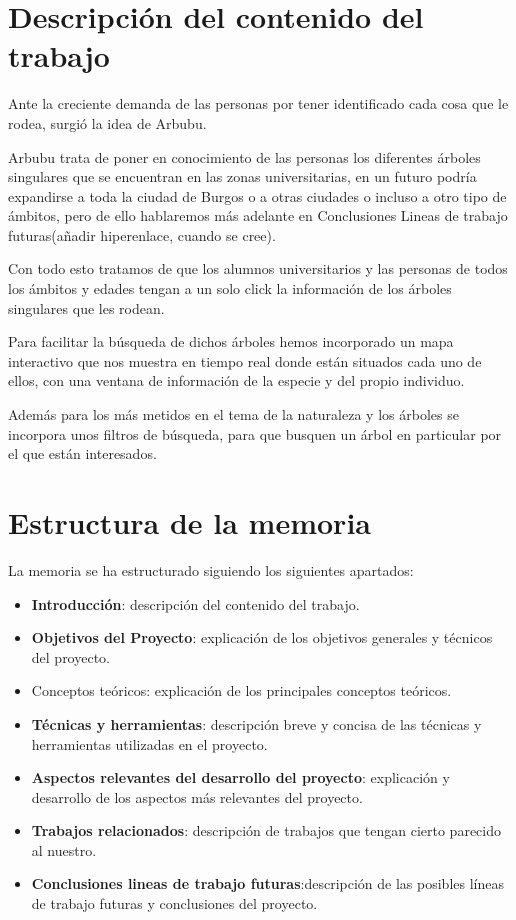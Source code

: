 
\section{Descripción del contenido del trabajo}
Ante la creciente demanda de las personas por tener identificado cada cosa que le rodea, surgió la idea de Arbubu.

Arbubu trata de poner en conocimiento de las personas los diferentes árboles singulares que se encuentran en las zonas universitarias, en un futuro podría expandirse a toda la ciudad de Burgos o a otras ciudades o incluso a otro tipo de ámbitos, pero de ello hablaremos más adelante en Conclusiones Lineas de trabajo futuras(añadir hiperenlace, cuando se cree).

Con todo esto tratamos de que los alumnos universitarios y las personas de todos los ámbitos y edades tengan a un solo click la información de los árboles singulares que les rodean.

Para facilitar la búsqueda de dichos árboles hemos incorporado un mapa interactivo que nos muestra en tiempo real donde están situados cada uno de ellos, con una ventana de información de la especie y del propio individuo.

Además para los más metidos en el tema de la naturaleza y los árboles se incorpora unos filtros de búsqueda, para que busquen un árbol en particular por el que están interesados.


\section{Estructura de la memoria}
La memoria se ha estructurado siguiendo los siguientes apartados:
\begin{itemize}
	\item \textbf{Introducción}: descripción del contenido del trabajo.
	\item \textbf{Objetivos del Proyecto}: explicación de los objetivos generales y técnicos del proyecto.
	\item Conceptos teóricos: explicación de los principales conceptos teóricos.
	\item \textbf{Técnicas y herramientas}: descripción breve y concisa de las técnicas y herramientas utilizadas en el proyecto.
	\item \textbf{Aspectos relevantes del desarrollo del proyecto}: explicación y desarrollo de los aspectos más relevantes del proyecto.
	\item \textbf{Trabajos relacionados}: descripción de trabajos que tengan cierto parecido al nuestro.
	\item \textbf{Conclusiones lineas de trabajo futuras}:descripción de las posibles líneas de trabajo futuras y conclusiones del proyecto.
\end{itemize}

